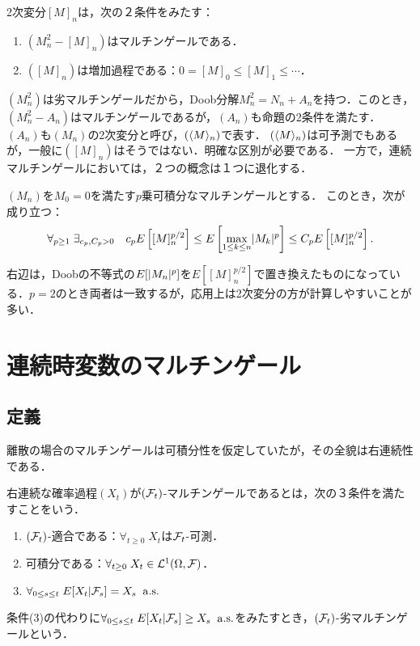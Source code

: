 \documentclass[uplatex,dvipdfmx]{jsreport}
\begin{document}
\begin{proposition}
    2次変分$[M]_n$は，次の２条件をみたす：
    \begin{enumerate}
        \item $(M_n^2-[M]_n)$はマルチンゲールである．
        \item $([M]_n)$は増加過程である：$0=[M]_0\le[M]_1\le\cdots$．
    \end{enumerate}
\end{proposition}

\begin{remark}
    $(M^2_n)$は劣マルチンゲールだから，Doob分解$M_n^2=N_n+A_n$を持つ．このとき，$(M_n^2-A_n)$はマルチンゲールであるが，$(A_n)$も命題の2条件を満たす．
    $(A_n)$も$(M_n)$の2次変分と呼び，$(\langle M\rangle_n)$で表す．
    $(\langle M\rangle_n)$は可予測でもあるが，一般に$([M]_n)$はそうではない．明確な区別が必要である．
    一方で，連続マルチンゲールにおいては，２つの概念は１つに退化する．
\end{remark}

\begin{theorem}
    $(M_n)$を$M_0=0$を満たす$p$乗可積分なマルチンゲールとする．
    このとき，次が成り立つ：
    \[\forall_{p\ge 1}\;\exists_{c_p,C_p>0}\quad c_pE\left[[M]^{p/2}_n\right]\le E\left[\max_{1\le k\le n}\lvert M_k\rvert^p\right]\le C_pE\left[[M]^{p/2}_n\right].\]
\end{theorem}
\begin{remarks}
    右辺は，Doobの不等式の$E[\lvert M_n\rvert^p]$を$E[[M]_n^{p/2}]$で置き換えたものになっている．$p=2$のとき両者は一致するが，応用上は2次変分の方が計算しやすいことが多い．
\end{remarks}

\section{連続時変数のマルチンゲール}

\subsection{定義}

\begin{tcolorbox}[colframe=ForestGreen, colback=ForestGreen!10!white,breakable,colbacktitle=ForestGreen!40!white,coltitle=black,fonttitle=\bfseries\sffamily,
title=]
    離散の場合のマルチンゲールは可積分性を仮定していたが，その全貌は右連続性である．
\end{tcolorbox}

\begin{definition}
    右連続な確率過程$(X_t)$が$(\mathcal{F}_t)$-マルチンゲールであるとは，次の３条件を満たすことをいう．
    \begin{enumerate}
        \item $(\mathcal{F}_t)$-適合である：$\forall_{t\ge0}\;X_t$は$\mathcal{F}_t$-可測．
        \item 可積分である：$\forall_{t\ge0}\;X_t\in\mathcal{L}^1(\Omega,\mathcal{F})$．
        \item $\forall_{0\le s\le t}\;E[X_t|\mathcal{F}_s]=X_s\;\;\mathrm{a.s.}$
    \end{enumerate}
    条件(3)の代わりに$\forall_{0\le s\le t}\;E[X_t|\mathcal{F}_s]\ge X_s\;\;\mathrm{a.s.}$をみたすとき，$(\mathcal{F}_t)$-劣マルチンゲールという．
\end{definition}
\end{document}
